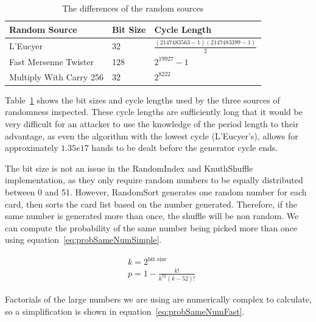 \begin{table}[H]
    \begin{adjustbox}{center}
    \begin{tabular}{l l l}
    \toprule
    Random Source           & Bit Size  & Cycle Length  \\
    \midrule
    L'Eucyer                & 32        & $ \displaystyle \frac{(2147483563-1)(2147483399-1)}{2}$   \\ \addlinespace
    Fast Mersenne Twister   & 128       & $ \displaystyle {2}^{19927}-1$                            \\ \addlinespace
    Multiply With Carry 256  & 32        & $ \displaystyle {2}^{8222}$                               \\
    \bottomrule
    \end{tabular}
    \end{adjustbox}
    \caption{The differences of the random sources}
    \label{table:rng}
\end{table}

Table~\ref{table:rng} shows the bit sizes and cycle lengths used by the three
sources of randomness inspected.
These cycle lengths are sufficiently long that it would be very difficult
for an attacker to use the knowledge of the period length to their advantage,
as even the algorithm with the lowest cycle (L'Eucyer's), allows for
approximately $1.35e17$ hands to be dealt before the generator cycle ends.

The bit size is not an issue in the RandomIndex and KnuthShuffle
implementation, as they only require random numbers to be equally distributed
between 0 and 51. However, RandomSort generates one random number for each
card, then sorts the card list based on the number generated. Therefore, if
the same number is generated more than once, the shuffle will be non random.
We can compute the probability of the same number being picked more than once
using equation~\ref{eq:probSameNumSimple}.

\begin{equation} \label{eq:probSameNumSimple}
\begin{split}
& k = 2^\text{bit size}\\
& p = 1 - \frac{k!}{{k^{52}}(k - 52)!}
\end{split}
\end{equation}

Factorials of the large numbers we are using are numerically complex to
calculate, so a simplification is shown in equation~\ref{eq:probSameNumFast}.

